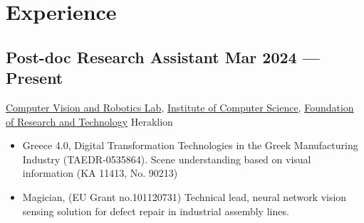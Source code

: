 \documentclass[a4,8pt]{article}
\newcommand{\subtext}[1]{
#1\par\vspace{-0.2cm}}
\newenvironment{zitemize}{
\begin{itemize}\itemsep0pt \parskip0pt \parsep1pt}
{\end{itemize}\vspace{-0.5cm}}
\begin{document}
\linespread{0.82} 
\section{Experience}
\linespread{0.6} 
\vspace{-0.1cm}
        

\subsection*{Post-doc Research Assistant \hfill Mar 2024 --- Present } 
\subtext{\href{https://www.ics.forth.gr/cvrl/}{Computer Vision and Robotics Lab}, \href{https://www.ics.forth.gr/}{Institute of Computer Science}, \href{https://www.forth.gr/}{Foundation of Research and Technology}  \hfill Heraklion} 
    \begin{zitemize}
        \item Greece 4.0, Digital Transformation Technologies in the Greek Manufacturing Industry (TAEDR-0535864). Scene understanding based on visual information (KA 11413, No. 90213)
        \item Magician, (EU Grant no.101120731) Technical lead, neural network vision sensing solution for defect repair in industrial assembly lines.
    \end{zitemize}
\end{document}
